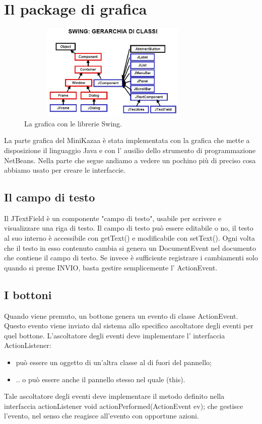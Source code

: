 \chapter{Il package di grafica}\label{chap:gui_package}
\begin{figure}[t]
 \centering
 \includegraphics[width=350px,height=175px,bb=14 14 518 368]{images/swing_diagram.eps}
 \caption{La grafica con le librerie Swing.}
 \label{fig:swing_diagram}
\end{figure}

La parte grafica del MiniKazaa è stata implementata con la grafica che mette a disposizione il linguaggio Java e con l' ausilio dello strumento di programmazione NetBeans.
Nella parte che segue andiamo a vedere un pochino più di preciso cosa abbiamo usato per creare le interfaccie.

\section{Il campo di testo}
Il JTextField è un componente "campo di testo", usabile per scrivere e visualizzare una riga di testo.
Il campo di testo può essere editabile o no, il testo al suo interno è accessibile con getText() e modificabile con setText().
Ogni volta che il testo in esso contenuto cambia si genera un DocumentEvent nel documento che contiene il campo di testo.
Se invece è sufficiente registrare i cambiamenti solo quando si
preme INVIO, basta gestire semplicemente l' ActionEvent.

\section{I bottoni}
Quando viene premuto, un bottone genera un evento di classe ActionEvent.
Questo evento viene inviato dal sistema allo specifico ascoltatore degli eventi per quel bottone.
L'ascoltatore degli eventi deve implementare l' interfaccia ActionListener:
\begin{itemize}
\item può essere un oggetto di un'altra classe al di fuori del
pannello;
\item .. o può essere anche il pannello stesso nel quale (this).
\end{itemize}
Tale ascoltatore degli eventi deve implementare il metodo definito nella interfaccia actionListener void actionPerformed(ActionEvent ev);
che gestisce l'evento, nel senso che reagisce all'evento con opportune azioni.

